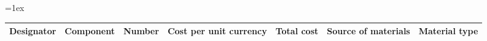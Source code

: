 \documentclass[11pt, letterpaper]{article}
\begin{document}
\tabulinesep=1ex
\begin{tabu} to \linewidth {|X|X|X|X|X|X|X|}
\hline
\textbf{Designator} & \textbf{Component} & \textbf{Number} & \textbf{Cost per unit currency} & \textbf{Total cost} & \textbf{Source of materials} & \textbf{Material type} \\\hline


\end{tabu}
\end{document}
